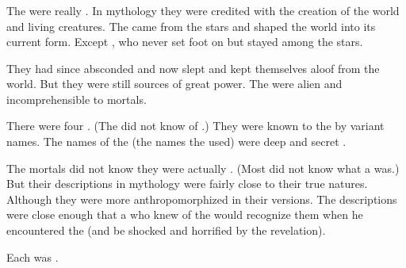 \subsubsection{\Primordials}
The \Primordials were really \xss.
In \Ortaican mythology they were credited with the creation of the world and living creatures.
The \Primordials came from the stars and shaped the world into its current form. 
Except \Nelxurra, who never set foot on \Miith but stayed among the stars. 

They had since absconded and now slept and kept themselves aloof from the world. 
But they were still sources of great power. 
The \Primordials were alien and incomprehensible to mortals. 

There were four \Primordials.
(The \Ortaicans did not know of .)
They were known to the \Ortaicans by variant names.
The  names of the \Primordials (the names the \dragons used) were deep and secret \arcana.

The mortals did not know they were actually \xss. 
(Most \rethyaxes did not know what a \quo{\xs} was.)
But their descriptions in \Ortaican mythology were fairly close to their true natures. 
Although they were more anthropomorphized in their \Ortaican versions.
The descriptions were close enough that a \rethyax who knew of the \Primordials would recognize them when he encountered the \xss (and be shocked and horrified by the revelation). 

Each \Primordial was . 




